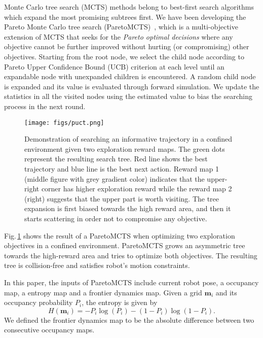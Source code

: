Monte Carlo tree search (MCTS) methods belong to best-first search algorithms which expand the most promising subtrees first.
We have been developing the Pareto Monte Carlo tree search (ParetoMCTS)~\cite{chen2019pareto}, which is a multi-objective extension of MCTS that seeks for the {\em Pareto optimal decisions} where any objective cannot be further improved without hurting (or compromising) other objectives. %
Starting from the root node, we select the child node according to Pareto Upper Confidence Bound (UCB) criterion at each level until an expandable node with unexpanded children is encountered.
A random child node is expanded and its value is evaluated through forward simulation.
We update the statistics in all the visited nodes using the estimated value to bias the searching process in the next round.
\begin{figure}[htbp] %
    \centering
    \texttt{[image: figs/puct.png]}
    \caption{Demonstration of searching an informative trajectory in a confined environment given two exploration reward maps.
    The green dots represent the resulting search tree.
    Red line shows the best trajectory and blue line is the best next action.
    Reward map 1 (middle figure with grey gradient color) indicates that the upper-right corner has higher exploration reward while the reward map 2  (right) suggests that the upper part is worth visiting.
    The tree expansion is first biased towards the high reward area, and then it starts scattering in order not to compromise any objective. \vspace{-10pt}
    }
    \label{fig:pareto_mcts}
\end{figure}
Fig.\,\ref{fig:pareto_mcts} shows the result of a ParetoMCTS when optimizing two exploration objectives in a confined environment.
ParetoMCTS grows an asymmetric tree towards the high-reward area and tries to optimize both objectives.
The resulting tree is collision-free and satisfies robot's motion constraints.

In this paper, the inputs of ParetoMCTS include current robot pose, a occupancy map, a entropy map and a frontier dynamics map.
Given a grid $\mathbf{m}_i$ and its occupancy probability $P_i$, the entropy is given by
\begin{equation}
    \label{eq:entropy}
    H(\mathbf{m}_i) = -P_i\log(P_i) - (1-P_i)\log(1-P_i).
\end{equation}
We defined the frontier dynamics map to be the absolute difference between two consecutive occupancy maps.

